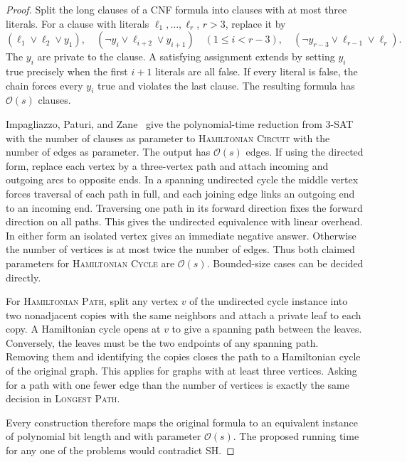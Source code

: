 \documentclass[11pt]{article}
\begin{document}
\begin{proof}
Split the long clauses of a CNF formula into clauses with at most three
literals. For a clause with literals \(\ell_1,\ldots,\ell_r\), \(r>3\),
replace it by
\[
 (\ell_1\lor\ell_2\lor y_1),\quad
 (\neg y_i\lor\ell_{i+2}\lor y_{i+1})\quad(1\le i<r-3),\quad
 (\neg y_{r-3}\lor\ell_{r-1}\lor\ell_r).
\]
The \(y_i\) are private to the clause. A satisfying assignment extends
by setting \(y_i\) true precisely when the first \(i+1\) literals are
all false. If every literal is false, the chain forces every \(y_i\)
true and violates the last clause. The resulting formula has
\(\mathcal O(s)\) clauses.

Impagliazzo, Paturi, and Zane~\cite[Section~3, following Theorem~5]{ipz}
give the polynomial-time reduction from 3-SAT with the number of clauses
as parameter to \textsc{Hamiltonian Circuit} with the number of edges as
parameter. The output has \(\mathcal O(s)\) edges. If using the directed
form, replace each vertex by a three-vertex path and attach incoming and
outgoing arcs to opposite ends. In a spanning undirected cycle the middle
vertex forces traversal of each path in full, and each joining edge links
an outgoing end to an incoming end. Traversing one path in its forward
direction fixes the forward direction on all paths. This gives the
undirected equivalence with linear overhead. In either form an isolated
vertex gives an immediate negative answer. Otherwise the number of
vertices is at most twice the number of edges. Thus both claimed
parameters for \textsc{Hamiltonian Cycle} are \(\mathcal O(s)\).
Bounded-size cases can be decided directly.

For \textsc{Hamiltonian Path}, split any vertex \(v\) of the undirected
cycle instance into two nonadjacent copies with the same neighbors and
attach a private leaf to each copy. A Hamiltonian cycle opens at \(v\)
to give a spanning path between the leaves. Conversely, the leaves must
be the two endpoints of any spanning path. Removing them and identifying
the copies closes the path to a Hamiltonian cycle of the original graph.
This applies for graphs with at least three vertices. Asking for a path
with one fewer edge than the number of vertices is exactly the same
decision in \textsc{Longest Path}.

Every construction therefore maps
the original formula to an equivalent instance of polynomial bit length
and with parameter \(\mathcal O(s)\). The proposed running time for any
one of the problems would contradict SH.
\end{proof}
\end{document}
